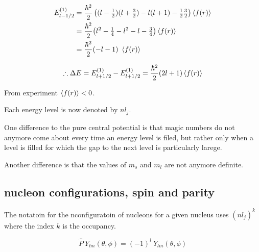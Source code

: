\documentclass[10pt, a4paper, twocolumn]{article}
\begin{document}
\begin{equation*}
\begin{aligned}
E_{l-1/2}^{(1)}
&=\frac{\hbar^2}{2}
\left((l-\tfrac12)(l+\tfrac32)
-l(l+1)-\tfrac12 \tfrac32 \right) \expval{f(r)}
\\&= \frac{\hbar^2}{2}
\pqty{l^2-\tfrac14 -l^2-l-\tfrac34}
\expval{f(r)}
\\&=\frac{\hbar ^2}{2}(-l-1)\ \expval{f(r)}
\end{aligned}
\end{equation*}

\[\therefore
\Delta E = E_{l+1/2}^{(1)}-E_{l+1/2}^{(1)}
=\frac{\hbar ^2}{2}(2l+1)\expval{f(r)}\]

From experiment $\expval{f(r)}<0$.

Each energy level is now denoted by $nl_j$.

One difference to the pure central potential is that magic numbers do not anymore come about every time an energy level is filed, but rather only when a level is filled for which the gap to the next level is particularly larege.

Another difference is that the values of $m_s$ and $m_l$ are not anymore definite.

\subsection{nucleon configurations, spin and parity}
The notatoin for the nconfiguratoin of nucleons for a given nucleus uses $(nl_j)^k$ where the index $k$ is the occupancy.

\[\hat P\ Y_{lm} (\theta , \phi)
=(-1)^l\ Y_{lm}(\theta ,\phi) \]
\end{document}
